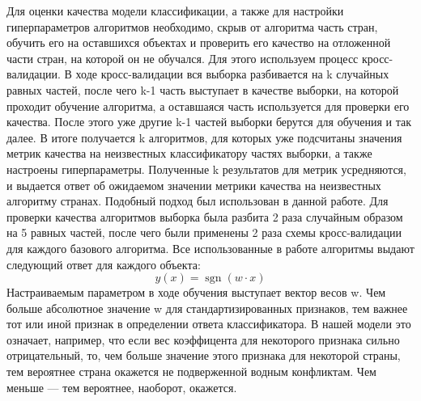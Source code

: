 \documentclass[a4paper, 12pt]{article}
\DeclareMathOperator{\sgn}{\mathop{sgn}}
\theoremstyle{plain} %
\theoremstyle{definition} %
\theoremstyle{remark} %
\begin{document}
Для оценки качества модели классификации, а также для настройки гиперпараметров алгоритмов необходимо, скрыв от алгоритма часть стран, обучить его на оставшихся объектах и проверить его качество на отложенной части стран, на которой он не обучался. Для этого используем процесс кросс-валидации. В ходе кросс-валидации вся выборка разбивается на k случайных равных частей, после чего k-1 часть выступает в качестве выборки, на которой проходит обучение алгоритма, а оставшаяся часть используется для проверки его качества. После этого уже другие k-1 частей выборки берутся для обучения и так далее. В итоге получается k алгоритмов, для которых уже подсчитаны значения метрик качества на неизвестных классификатору частях выборки, а также настроены гиперпараметры. Полученные k результатов для метрик усредняются, и выдается ответ об ожидаемом значении метрики качества на неизвестных алгоритму странах. Подобный подход был использован в данной работе. Для проверки качества алгоритмов выборка была разбита 2 раза случайным образом на 5 равных частей, после чего были применены 2 раза схемы кросс-валидации для каждого базового алгоритма.
Все использованные в работе алгоритмы выдают следующий ответ для каждого объекта:
\[
y(x) = \sgn(w \cdot x)
\]
Настраиваемым параметром в ходе обучения выступает вектор весов w. Чем больше абсолютное значение w для стандартизированных признаков, тем важнее тот или иной признак в определении ответа классификатора. В нашей модели это означает, например, что если вес коэффицента для некоторого признака сильно отрицательный, то, чем больше значение этого признака для некоторой страны, тем вероятнее страна окажется не подверженной водным конфликтам. Чем меньше  --- тем вероятнее, наоборот, окажется. 
\end{document}
